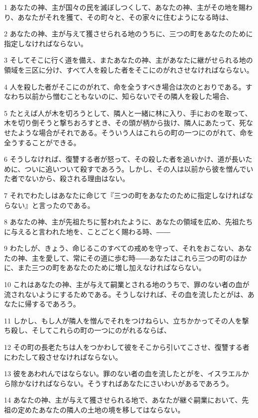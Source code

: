 \par 1 あなたの神、主が国々の民を滅ぼしつくして、あなたの神、主がその地を賜わり、あなたがそれを獲て、その町々と、その家々に住むようになる時は、
\par 2 あなたの神、主が与えて獲させられる地のうちに、三つの町をあなたのために指定しなければならない。
\par 3 そしてそこに行く道を備え、またあなたの神、主があなたに継がせられる地の領域を三区に分け、すべて人を殺した者をそこにのがれさせなければならない。
\par 4 人を殺した者がそこにのがれて、命を全うすべき場合は次のとおりである。すなわち以前から憎むこともないのに、知らないでその隣人を殺した場合、
\par 5 たとえば人が木を切ろうとして、隣人と一緒に林に入り、手におのを取って、木を切り倒そうと撃ちおろすとき、その頭が柄から抜け、隣人にあたって、死なせたような場合がそれである。そういう人はこれらの町の一つにのがれて、命を全うすることができる。
\par 6 そうしなければ、復讐する者が怒って、その殺した者を追いかけ、道が長いために、ついに追いついて殺すであろう。しかし、その人は以前から彼を憎んでいた者でないから、殺される理由はない。
\par 7 それでわたしはあなたに命じて『三つの町をあなたのために指定しなければならない』と言ったのである。
\par 8 あなたの神、主が先祖たちに誓われたように、あなたの領域を広め、先祖たちに与えると言われた地を、ことごとく賜わる時、――
\par 9 わたしが、きょう、命じるこのすべての戒めを守って、それをおこない、あなたの神、主を愛して、常にその道に歩む時――あなたはこれら三つの町のほかに、また三つの町をあなたのために増し加えなければならない。
\par 10 これはあなたの神、主が与えて嗣業とされる地のうちで、罪のない者の血が流されないようにするためである。そうしなければ、その血を流したとがは、あなたに帰するであろう。
\par 11 しかし、もし人が隣人を憎んでそれをつけねらい、立ちかかってその人を撃ち殺し、そしてこれらの町の一つにのがれるならば、
\par 12 その町の長老たちは人をつかわして彼をそこから引いてこさせ、復讐する者にわたして殺させなければならない。
\par 13 彼をあわれんではならない。罪のない者の血を流したとがを、イスラエルから除かなければならない。そうすればあなたにさいわいがあるであろう。
\par 14 あなたの神、主が与えて獲させられる地で、あなたが継ぐ嗣業において、先祖の定めたあなたの隣人の土地の境を移してはならない。
